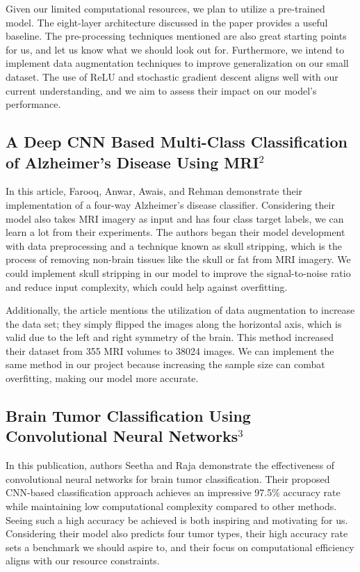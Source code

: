\documentclass[conference]{IEEEtran}
\begin{document}
Given our limited computational resources, we plan to utilize a pre-trained model. The eight-layer architecture discussed in the paper provides a useful baseline. The pre-processing techniques mentioned are also great starting points for us, and let us know what we should look out for. Furthermore, we intend to implement data augmentation techniques to improve generalization on our small dataset. The use of ReLU and stochastic gradient descent aligns well with our current understanding, and we aim to assess their impact on our model's performance.

\subsection{\large A Deep CNN Based Multi-Class Classification of Alzheimer's Disease Using MRI$^{2}$}

In this article, Farooq, Anwar, Awais, and Rehman demonstrate their implementation of a four-way Alzheimer's disease classifier. Considering their model also takes MRI imagery as input and has four class target labels, we can learn a lot from their experiments. The authors began their model development with data preprocessing and a technique known as skull stripping, which is the process of removing non-brain tissues like the skull or fat from MRI imagery. We could implement skull stripping in our model to improve the signal-to-noise ratio and reduce input complexity, which could help against overfitting. 

Additionally, the article mentions the utilization of data augmentation to increase the data set; they simply flipped the images along the horizontal axis, which is valid due to the left and right symmetry of the brain. This method increased their dataset from 355 MRI volumes to 38024 images. We can implement the same method in our project because increasing the sample size can combat overfitting, making our model more accurate.

\subsection{\large Brain Tumor Classification Using Convolutional Neural Networks$^{3}$}

In this publication, authors Seetha and Raja demonstrate the effectiveness of convolutional neural networks for brain tumor classification. Their proposed CNN-based classification approach achieves an impressive 97.5\% accuracy rate while maintaining low computational complexity compared to other methods. Seeing such a high accuracy be achieved is both inspiring and motivating for us. Considering their model also predicts four tumor types, their high accuracy rate sets a benchmark we should aspire to, and their focus on computational efficiency aligns with our resource constraints. 
\end{document}
